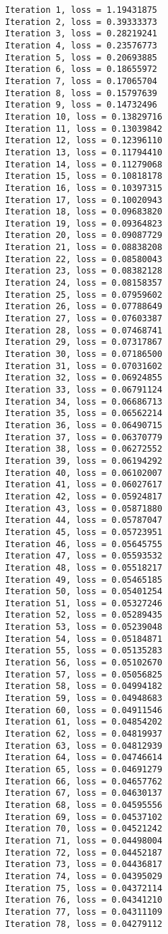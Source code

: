 \documentclass[11pt]{article}
\begin{document}
    \begin{Verbatim}[commandchars=\\\{\}]
Iteration 1, loss = 1.19431875
Iteration 2, loss = 0.39333373
Iteration 3, loss = 0.28219241
Iteration 4, loss = 0.23576773
Iteration 5, loss = 0.20693885
Iteration 6, loss = 0.18655972
Iteration 7, loss = 0.17065704
Iteration 8, loss = 0.15797639
Iteration 9, loss = 0.14732496
Iteration 10, loss = 0.13829716
Iteration 11, loss = 0.13039842
Iteration 12, loss = 0.12396110
Iteration 13, loss = 0.11794410
Iteration 14, loss = 0.11279068
Iteration 15, loss = 0.10818178
Iteration 16, loss = 0.10397315
Iteration 17, loss = 0.10020943
Iteration 18, loss = 0.09683820
Iteration 19, loss = 0.09364823
Iteration 20, loss = 0.09087729
Iteration 21, loss = 0.08838208
Iteration 22, loss = 0.08580043
Iteration 23, loss = 0.08382128
Iteration 24, loss = 0.08158357
Iteration 25, loss = 0.07959602
Iteration 26, loss = 0.07788649
Iteration 27, loss = 0.07603387
Iteration 28, loss = 0.07468741
Iteration 29, loss = 0.07317867
Iteration 30, loss = 0.07186500
Iteration 31, loss = 0.07031602
Iteration 32, loss = 0.06924855
Iteration 33, loss = 0.06791124
Iteration 34, loss = 0.06686713
Iteration 35, loss = 0.06562214
Iteration 36, loss = 0.06490715
Iteration 37, loss = 0.06370779
Iteration 38, loss = 0.06272552
Iteration 39, loss = 0.06194292
Iteration 40, loss = 0.06102007
Iteration 41, loss = 0.06027617
Iteration 42, loss = 0.05924817
Iteration 43, loss = 0.05871880
Iteration 44, loss = 0.05787047
Iteration 45, loss = 0.05723951
Iteration 46, loss = 0.05645755
Iteration 47, loss = 0.05593532
Iteration 48, loss = 0.05518217
Iteration 49, loss = 0.05465185
Iteration 50, loss = 0.05401254
Iteration 51, loss = 0.05327246
Iteration 52, loss = 0.05289435
Iteration 53, loss = 0.05239048
Iteration 54, loss = 0.05184871
Iteration 55, loss = 0.05135283
Iteration 56, loss = 0.05102670
Iteration 57, loss = 0.05056825
Iteration 58, loss = 0.04994182
Iteration 59, loss = 0.04948683
Iteration 60, loss = 0.04911546
Iteration 61, loss = 0.04854202
Iteration 62, loss = 0.04819937
Iteration 63, loss = 0.04812939
Iteration 64, loss = 0.04746614
Iteration 65, loss = 0.04691279
Iteration 66, loss = 0.04657762
Iteration 67, loss = 0.04630137
Iteration 68, loss = 0.04595556
Iteration 69, loss = 0.04537102
Iteration 70, loss = 0.04521242
Iteration 71, loss = 0.04498004
Iteration 72, loss = 0.04452187
Iteration 73, loss = 0.04436817
Iteration 74, loss = 0.04395029
Iteration 75, loss = 0.04372114
Iteration 76, loss = 0.04341210
Iteration 77, loss = 0.04311109
Iteration 78, loss = 0.04279112

\end{Verbatim}
\end{document}
